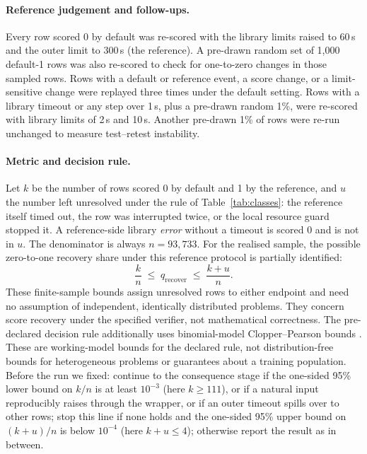 \documentclass[11pt,a4paper]{article}
\begin{document}
\paragraph{Reference judgement and follow-ups.} Every row scored 0 by default was re-scored with the library limits raised to 60\,s and the outer limit to 300\,s (the reference). A pre-drawn random set of 1,000 default-1 rows was also re-scored to check for one-to-zero changes in those sampled rows. Rows with a default or reference event, a score change, or a limit-sensitive change were replayed three times under the default setting. Rows with a library timeout or any step over 1\,s, plus a pre-drawn random 1\%, were re-scored with library limits of 2\,s and 10\,s. Another pre-drawn 1\% of rows were re-run unchanged to measure test--retest instability.

\paragraph{Metric and decision rule.} Let $k$ be the number of rows scored 0 by default and 1 by the reference, and $u$ the number left unresolved under the rule of Table~\ref{tab:classes}: the reference itself timed out, the row was interrupted twice, or the local resource guard stopped it. A reference-side library \emph{error} without a timeout is scored 0 and is not in $u$. The denominator is always $n=93{,}733$. For the realised sample, the possible zero-to-one recovery share under this reference protocol is partially identified:
\[\frac{k}{n}\;\le\; q_{\text{recover}} \;\le\; \frac{k+u}{n}.\]
These finite-sample bounds assign unresolved rows to either endpoint and need no assumption of independent, identically distributed problems. They concern score recovery under the specified verifier, not mathematical correctness. The pre-declared decision rule additionally uses binomial-model Clopper--Pearson bounds \cite{clopper}. These are working-model bounds for the declared rule, not distribution-free bounds for heterogeneous problems or guarantees about a training population. Before the run we fixed: continue to the consequence stage if the one-sided 95\% lower bound on $k/n$ is at least $10^{-3}$ (here $k\ge 111$), or if a natural input reproducibly raises through the wrapper, or if an outer timeout spills over to other rows; stop this line if none holds and the one-sided 95\% upper bound on $(k+u)/n$ is below $10^{-4}$ (here $k+u\le 4$); otherwise report the result as in between.
\end{document}
